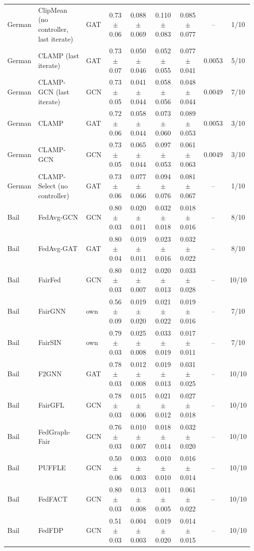 \begin{longtable}{lp{3.2cm}lcccccc}
German & ClipMean (no controller, last iterate) & GAT & 0.73$\pm$0.06 & 0.088$\pm$0.069 & 0.110$\pm$0.083 & 0.085$\pm$0.077 & -- & 1/10 \\
German & CLAMP (last iterate) & GAT & 0.73$\pm$0.07 & 0.050$\pm$0.046 & 0.052$\pm$0.055 & 0.077$\pm$0.041 & 0.0053 & 5/10 \\
German & CLAMP-GCN (last iterate) & GCN & 0.73$\pm$0.05 & 0.041$\pm$0.044 & 0.058$\pm$0.056 & 0.048$\pm$0.044 & 0.0049 & 7/10 \\
German & CLAMP & GAT & 0.72$\pm$0.06 & 0.058$\pm$0.044 & 0.073$\pm$0.060 & 0.089$\pm$0.053 & 0.0053 & 3/10 \\
German & CLAMP-GCN & GCN & 0.73$\pm$0.05 & 0.065$\pm$0.044 & 0.097$\pm$0.053 & 0.061$\pm$0.063 & 0.0049 & 3/10 \\
German & CLAMP-Select (no controller) & GAT & 0.73$\pm$0.06 & 0.077$\pm$0.066 & 0.094$\pm$0.076 & 0.081$\pm$0.067 & -- & 1/10 \\
Bail & FedAvg-GCN & GCN & 0.80$\pm$0.03 & 0.020$\pm$0.011 & 0.032$\pm$0.018 & 0.018$\pm$0.016 & -- & 8/10 \\
Bail & FedAvg-GAT & GAT & 0.80$\pm$0.04 & 0.019$\pm$0.011 & 0.023$\pm$0.016 & 0.032$\pm$0.022 & -- & 8/10 \\
Bail & FairFed & GCN & 0.80$\pm$0.03 & 0.012$\pm$0.007 & 0.020$\pm$0.013 & 0.033$\pm$0.028 & -- & 10/10 \\
Bail & FairGNN & own & 0.56$\pm$0.09 & 0.019$\pm$0.020 & 0.021$\pm$0.022 & 0.019$\pm$0.016 & -- & 7/10 \\
Bail & FairSIN & own & 0.79$\pm$0.03 & 0.025$\pm$0.008 & 0.033$\pm$0.019 & 0.017$\pm$0.011 & -- & 7/10 \\
Bail & F2GNN & GAT & 0.78$\pm$0.03 & 0.012$\pm$0.008 & 0.019$\pm$0.013 & 0.031$\pm$0.025 & -- & 10/10 \\
Bail & FairGFL & GCN & 0.78$\pm$0.03 & 0.015$\pm$0.006 & 0.021$\pm$0.012 & 0.027$\pm$0.018 & -- & 10/10 \\
Bail & FedGraph-Fair & GCN & 0.76$\pm$0.03 & 0.010$\pm$0.007 & 0.018$\pm$0.014 & 0.032$\pm$0.020 & -- & 10/10 \\
Bail & PUFFLE & GCN & 0.50$\pm$0.06 & 0.003$\pm$0.003 & 0.010$\pm$0.010 & 0.016$\pm$0.014 & -- & 10/10 \\
Bail & FedFACT & GCN & 0.80$\pm$0.03 & 0.013$\pm$0.008 & 0.011$\pm$0.005 & 0.061$\pm$0.022 & -- & 10/10 \\
Bail & FedFDP & GCN & 0.51$\pm$0.03 & 0.004$\pm$0.003 & 0.019$\pm$0.020 & 0.014$\pm$0.015 & -- & 10/10 \\

\end{longtable}
